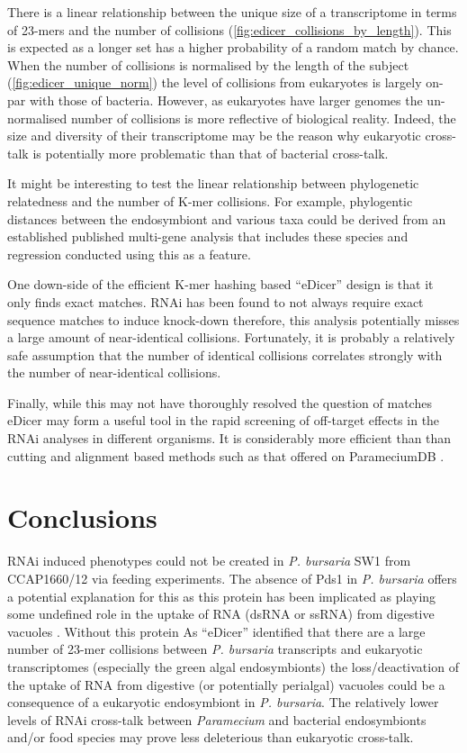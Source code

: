There is a linear relationship between the unique size of a transcriptome
in terms of 23-mers and the number of collisions (\cref{fig:edicer_collisions_by_length}).  
This is expected
as a longer set has a higher probability of a random match by chance.
When the number of collisions is normalised by the length of the subject (\cref{fig:edicer_unique_norm})
the level of collisions from eukaryotes is largely on-par with
those of bacteria.  However, as eukaryotes have larger genomes
the un-normalised number of collisions is more reflective of biological
reality.  Indeed, the size and diversity of their transcriptome
may be the reason why eukaryotic cross-talk is potentially
more problematic than that of bacterial cross-talk.


It might be interesting to test the linear relationship between phylogenetic
relatedness and the number of K-mer collisions.  For example, phylogentic distances
between the endosymbiont and various taxa could be derived from an established
published multi-gene analysis that includes these species and regression
conducted using this as a feature. 

One down-side of the efficient K-mer hashing based ``eDicer'' design is that
it only finds exact matches.  RNAi has been found to not always require exact
sequence matches to induce knock-down \citep{Elbashir2001} therefore,
this analysis potentially misses a large amount of near-identical collisions.
Fortunately, it is probably a relatively safe assumption that the number
of identical collisions correlates strongly with the number of near-identical collisions.

Finally, while this may not have thoroughly resolved the question of matches
eDicer may form a useful tool in the rapid screening of off-target effects
in the RNAi analyses in different organisms.   It is considerably
more efficient than than cutting and alignment based methods such as that
offered on ParameciumDB \citep{Arnaiz2011}.

\section{Conclusions}

RNAi induced phenotypes could not be created in \textit{P. bursaria} SW1 from CCAP1660/12
via feeding experiments.  The absence of Pds1 in \textit{P. bursaria} offers a potential 
explanation for this as this protein has been implicated as playing some undefined role
in the uptake of RNA (dsRNA or ssRNA) from digestive vacuoles \citep{Carradec2015}.
Without this protein 
As ``eDicer'' identified that there are a large number of 23-mer collisions
between \textit{P. bursaria} transcripts and eukaryotic transcriptomes (especially
the green algal endosymbionts) the loss/deactivation of the uptake of RNA from 
digestive (or potentially perialgal) vacuoles could be a consequence of 
a eukaryotic endosymbiont in \textit{P. bursaria}.  
The relatively lower levels of RNAi cross-talk between
\textit{Paramecium} and bacterial endosymbionts and/or food species may prove
less deleterious than eukaryotic cross-talk. 

